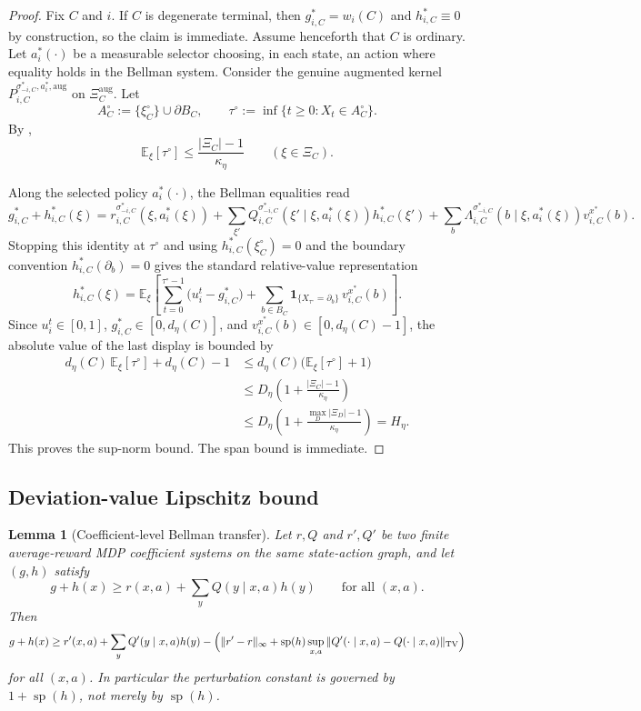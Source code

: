 \documentclass[12pt]{article}
\newtheorem{lemma}[theorem]{Lemma}
\theoremstyle{definition}
\newcommand{\E}{\mathbb{E}}
\newcommand{\1}{\mathbf{1}}
\DeclareMathOperator{\spn}{sp}
\begin{document}
\begin{proof}
Fix $C$ and $i$. If $C$ is degenerate terminal, then
$g_{i,C}^*=w_i(C)$ and $h_{i,C}^*\equiv 0$ by construction, so the claim is
immediate. Assume henceforth that $C$ is ordinary. Let $a_i^*(\cdot)$ be a
measurable selector choosing, in each state, an action where equality holds in
the Bellman system. Consider the genuine augmented kernel
$P_{i,C}^{\sigma_{-i,C}^*,a_i^*,\mathrm{aug}}$ on
$\Xi_C^{\mathrm{aug}}$. Let
\[
A_C^\circ:=\{\xi_C^\circ\}\cup\partial B_C,
\qquad
\tau^\circ:=\inf\{t\ge 0:X_t\in A_C^\circ\}.
\]
By ,
\[
\E_\xi[\tau^\circ]\le \frac{|\Xi_C|-1}{\kappa_\eta}
\qquad (\xi\in\Xi_C).
\]

Along the selected policy $a_i^*(\cdot)$, the Bellman equalities read
\[
g_{i,C}^*+h_{i,C}^*(\xi)
=
r_{i,C}^{\sigma_{-i,C}^*}(\xi,a_i^*(\xi))
+
\sum_{\xi'}Q_{i,C}^{\sigma_{-i,C}^*}(\xi'\mid\xi,a_i^*(\xi))h_{i,C}^*(\xi')
+
\sum_b\Lambda_{i,C}^{\sigma_{-i,C}^*}(b\mid\xi,a_i^*(\xi))v_{i,C}^{x^*}(b).
\]
Stopping this identity at $\tau^\circ$ and using $h_{i,C}^*(\xi_C^\circ)=0$ and
the boundary convention $h_{i,C}^*(\partial_b)=0$ gives the standard relative-value
representation
\[
h_{i,C}^*(\xi)
=
\E_\xi\!\left[
\sum_{t=0}^{\tau^\circ-1}\bigl(u_i^t-g_{i,C}^*\bigr)
+
\sum_{b\in B_C}\1_{\{X_{\tau^\circ}=\partial_b\}}\,v_{i,C}^{x^*}(b)
\right].
\]
Since $u_i^t\in[0,1]$, $g_{i,C}^*\in[0,d_\eta(C)]$, and
$v_{i,C}^{x^*}(b)\in[0,d_\eta(C)-1]$, the absolute value of the last display is
bounded by
\[
\begin{aligned}
d_\eta(C)\,\E_\xi[\tau^\circ] + d_\eta(C)-1
&\le
d_\eta(C)\bigl(\E_\xi[\tau^\circ]+1\bigr)
\\
&\le
D_\eta\left(1+\frac{|\Xi_C|-1}{\kappa_\eta}\right)
\\
&\le
D_\eta\left(1+\frac{\max_D|\Xi_D|-1}{\kappa_\eta}\right)
=
H_\eta.
\end{aligned}
\]
This proves the sup-norm bound. The span bound is immediate.
\end{proof}

\subsection{Deviation-value Lipschitz bound}

\begin{lemma}[Coefficient-level Bellman transfer]
\label{lem:coefficient-transfer}
Let $r,Q$ and $r',Q'$ be two finite average-reward MDP coefficient systems on the
same state-action graph, and let $(g,h)$ satisfy
\[
g+h(x)\ge r(x,a)+\sum_y Q(y\mid x,a)h(y)
\qquad\text{for all }(x,a).
\]
Then
\[
g+h(x)
\ge
r'(x,a)+\sum_y Q'(y\mid x,a)h(y)
-\Bigl(\|r'-r\|_\infty + \spn(h)\sup_{x,a}\|Q'(\cdot\mid x,a)-Q(\cdot\mid x,a)\|_{\mathrm{TV}}\Bigr)
\]
for all $(x,a)$. In particular the perturbation constant is governed by
$1+\spn(h)$, not merely by $\spn(h)$.
\end{lemma}
\end{document}
